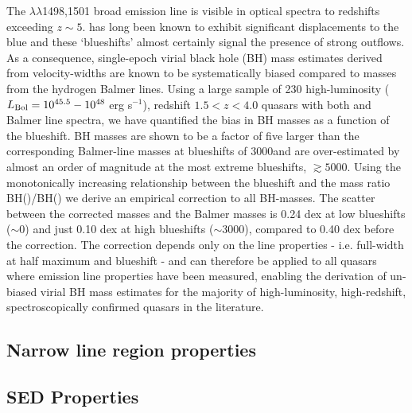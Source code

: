 The $\lambda\lambda$1498,1501 broad emission line is visible in optical spectra to redshifts exceeding $z\sim5$. 
 has long been known to exhibit significant displacements to the blue and these `blueshifts' almost certainly signal the presence of strong outflows.
As a consequence, single-epoch virial black hole (BH) mass estimates derived from  velocity-widths are known to be systematically biased compared to masses from the hydrogen Balmer lines. 
Using a large sample of 230 high-luminosity ($L_{\rm Bol} = 10^{45.5}-10^{48}$ erg s$^{-1}$), redshift $1.5 < z < 4.0$ quasars with both  and Balmer line spectra, we have quantified the bias in  BH masses as a function of the  blueshift. 
 BH masses are shown to be a factor of five larger than the corresponding Balmer-line masses at  blueshifts of 3000\kms and are over-estimated by almost an order of magnitude at the most extreme blueshifts, $\gtrsim 5000$\kms.
Using the monotonically increasing relationship between the  blueshift and the mass ratio BH()/BH(\hans) we derive an empirical correction to all  BH-masses.
The scatter between the corrected  masses and the Balmer masses is 0.24 dex at low  blueshifts ($\sim$0\kms) and just 0.10 dex at high blueshifts ($\sim$3000\kms), compared to 0.40 dex before the correction. 
The correction depends only on the  line properties - i.e. full-width at half maximum and blueshift - and can therefore be applied to all quasars where  emission line properties have been measured, enabling the derivation of un-biased virial BH mass estimates for the majority of high-luminosity, high-redshift, spectroscopically confirmed quasars in the literature.

\subsection{Narrow line region properties}

\subsection{SED Properties}








